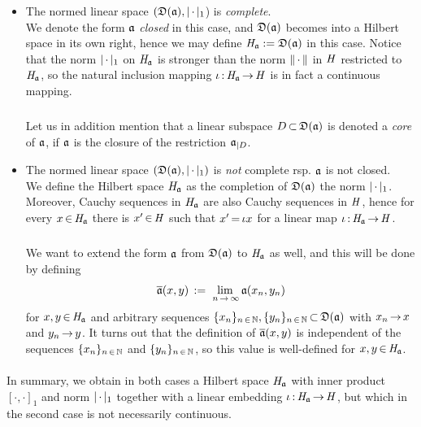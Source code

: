 \documentclass[11pt,twoside]{article}
\begin{document}
\begin{itemize}[leftmargin=4mm]
\item[1.]
The normed linear space $(\domain{\sql},\abs{\,\cdot\,} _1$)
is \textit{complete}.\\
We denote the form $\mathfrak{a}$ \textit{closed} in this case,
and $\mathfrak{D}(\mathfrak{a})$ becomes into a Hilbert space in its own right,
hence we may define $\mathit{H}_{\mathfrak{a}} := \mathfrak{D}(\mathfrak{a})$ in this case. 
Notice that the norm $\abs{\,\cdot\,} _1$ on $\mathit{H}_{\mathfrak{a}}$
is stronger than the norm $\left\lVert \,\cdot\, \right\rVert$ in $\mathit{H}$
restricted to $\mathit{H}_{\mathfrak{a}}$,
so the natural inclusion mapping $\iota {\,:\,} \mathit{H}_{\mathfrak{a}} {\,\to\,} \mathit{H}$
is in fact a continuous mapping.

\subparagraph{} %
Let us in addition mention that
a linear subspace $D {\,\subset\,} \mathfrak{D}(\mathfrak{a})$
is denoted a \textit{core} of $\mathfrak{a}$,
if $\mathfrak{a}$ is the closure of the restriction $\mathfrak{a}_{|D}$.

\item[2.]
The normed linear space $(\domain{\sql},\abs{\,\cdot\,} _1)$
is \textit{not} complete rsp. $\mathfrak{a}$ is not closed.\\
We define the Hilbert space $\mathit{H}_{\mathfrak{a}}$ as the completion
of $\mathfrak{D}(\mathfrak{a})$ {\wrt} the norm $\abs{\,\cdot\,} _1$.
Moreover,
Cauchy sequences in $\mathit{H}_{\mathfrak{a}}$ are also Cauchy sequences in $\mathit{H}$,
hence for every $x {\,\in\,} \mathit{H}_{\mathfrak{a}}$
there is $x' {\,\in\,} \mathit{H}$ such that $x' {\,=\,} \iota x$
for a linear map $\iota {\,:\,} \mathit{H}_{\mathfrak{a}} {\,\to\,} \mathit{H}$.

\subparagraph{}
We want to extend the form $\mathfrak{a}$ from $\mathfrak{D}(\mathfrak{a})$ to $\mathit{H}_{\mathfrak{a}}$
as well,
and this will be done by defining
\[
\overline{\mathfrak{a}}(x,y) \,:=\, \lim_{\,n {\,\to\,} \infty} \mathfrak{a}(x_n,y_n)
\]
for $x,y {\,\in\,} \mathit{H}_{\mathfrak{a}}$ and arbitrary sequences
$\{x_n\}_{n {\,\in\,} {\mathbb{N}}}, \{y_n\}_{n {\,\in\,} {\mathbb{N}}} {\,\subset\,} \mathfrak{D}(\mathfrak{a})$
with $x_n {\,\to\,} x$ and $y_n {\,\to\,} y$.
It turns out that
the definition of $\overline{\mathfrak{a}}(x,y)$ is independent of
the sequences $\{x_n\}_{n {\,\in\,} {\mathbb{N}}}$ and $\{y_n\}_{n {\,\in\,} {\mathbb{N}}}$,
so this value is well-defined for $x,y {\,\in\,} \mathit{H}_{\mathfrak{a}}$.
\end{itemize}

\paragraph{} %
In summary,
we obtain in both cases a Hilbert space $\mathit{H}_{\mathfrak{a}}$ with inner product
$[\cdot,\cdot]_1$ and norm $\abs{\,\cdot\,} _1$
together with a linear embedding $\iota {\,:\,} \mathit{H}_{\mathfrak{a}} {\,\to\,} \mathit{H}$,
but which in the second case is not necessarily continuous.
\end{document}
